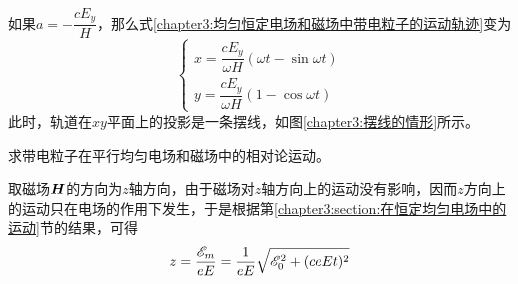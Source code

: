 如果$a=-\dfrac{cE_y}{H}$，那么式\eqref{chapter3:均匀恒定电场和磁场中带电粒子的运动轨迹}变为
\begin{equation}
\begin{cases}
	x = \dfrac{cE_y}{\omega H}(\omega t-\sin \omega t) \\[1.5ex]
	y = \dfrac{cE_y}{\omega H}(1-\cos\omega t)
\end{cases}
\end{equation}
此时，轨道在$xy$平面上的投影是一条摆线，如图\ref{chapter3:摆线的情形}所示。

\begin{example}
求带电粒子在平行均匀电场和磁场中的相对论运动。
\end{example}
\begin{solution}
取磁场$\boldsymbol{H}$的方向为$z$轴方向，由于磁场对$z$轴方向上的运动没有影响，因而$z$方向上的运动只在电场的作用下发生，于是根据第\ref{chapter3:section:在恒定均匀电场中的运动}节的结果，可得
\begin{equation}
	z = \frac{\mathscr{E}_m}{eE} = \frac{1}{eE}\sqrt{\mathscr{E}_0^2+(ceEt)^2}
	\label{chapter3:例3.2在z方向上的运动}
\end{equation}


\end{solution}

